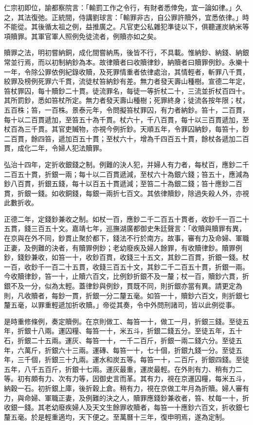 仁宗初即位，諭都察院言：「輸罰工作之令行，有財者悉倖免，宜一論如律。」久之，其法復弛。正統間，侍講劉球言：「輸罪非古，自公罪許贖外，宜悉依律。」時不能從。其後循太祖之例，益推廣之。凡官吏公私雜犯準徒以下，俱聽運炭納米等項贖罪。其軍官軍人照例免徒流者，例贖亦如之矣。

贖罪之法，明初嘗納銅，成化間嘗納馬，後皆不行，不具載。惟納鈔、納錢、納銀常並行焉，而以初制納鈔為本。故律贖者曰收贖律鈔，納贖者曰贖罪例鈔。永樂十一年，令除公罪依例紀錄收贖，及死罪情重者依律處治，其情輕者，斬罪八千貫，絞罪及榜例死罪六千貫，流徒杖笞納鈔有差。無力者發天壽山種樹。宣德二年定，笞杖罪囚，每十贖鈔二十貫。徒流罪名，每徒一等折杖二十，三流並折杖百四十。其所罰鈔，悉如笞杖所定。無力者發天壽山種樹；死罪終身；徒流各按年限；杖，五百株；笞，一百株。景泰元年，令問擬笞杖罪囚，有力者納鈔。笞十，二百貫，每十以二百貫遞加，至笞五十為千貫。杖六十，千八百貫，每十以三百貫遞加，至杖百為三千貫。其官吏贓物，亦視今例折鈔。天順五年，令罪囚納鈔，每笞十，鈔二百貫，餘四笞，遞加百五十貫；至杖六十，增為千四百五十貫，餘杖各遞加二百貫，成化二年，令婦人犯法贖罪。

弘治十四年，定折收銀錢之制。例難的決人犯，并婦人有力者，每杖百，應鈔二千二百五十貫，折銀一兩；每十以二百貫遞減，至杖六十為銀六錢；笞五十，應減為鈔八百貫，折銀五錢，每十以百五十貫遞減；至笞二十為銀二錢；笞十應鈔二百貫，折銀一錢。如收銅錢，每銀一兩折七百文。其依律贖鈔，除過失殺人外，亦視此數折收。

正德二年，定錢鈔兼收之制。如杖一百，應鈔二千二百五十貫者，收鈔千一百二十五貫，錢三百五十文。嘉靖七年，巡撫湖廣都御史朱廷聲言：「收贖與贖罪有異，在京與在外不同，鈔貫止聚於都下，錢法不行於南方。故事，審有力及命婦、軍職正妻，及例難的決者，有贖罪例鈔；老幼廢疾及婦人餘罪，有收贖律鈔。贖罪例鈔，錢鈔兼收，如笞一十，收鈔百貫，收錢三十五文，其鈔二百貫，折銀一錢。杖一百，收鈔千一百二十五貫，收錢三百五十文，其鈔二千二百五十貫，折銀一兩。今收贖律鈔，笞一十，止贖六百文，比例鈔折銀不及一釐；杖一百，贖鈔六貫，折銀不及一分，似為太輕。蓋律鈔與例鈔，貫既不同，則折銀亦當有異。請更定為則，凡收贖者，每鈔一貫，折銀一分二釐五毫。如笞一十，贖鈔六百文，則折銀七釐五毫，以罪重輕遞加折收贖。」帝從其奏，令中外問刑諸司，皆以此例從事。

是時重修條例，奏定贖例。在京則做工、每笞一十，做工一月，折銀三錢。至徒五年，折銀十八兩。運囚糧、每笞一十，米五斗，折銀二錢五分。至徒五年，五十石，折銀二十五兩。運灰、每笞一十，一千二百斤，折銀一兩二錢六分。至徒五年，六萬斤，折銀六十三兩。運磚、每笞一十，七十個，折銀九錢一分。至徒五年，三千個，折銀三十九兩。運水和炭五等。每笞一十，二百斤，折銀四錢。至徒五年，八千五百斤，折銀十七兩。運灰最重，運炭最輕。在外則有力、稍有力二等。初有頗有力、次有力等，因御史言而革。其有力，視在京運囚糧，每米五斗，納穀一石。初折銀上庫，後折穀上倉。稍有力，視在京做工年月為折贖。婦人審有力，與命婦、軍職正妻，及例難的決之人，贖罪應錢鈔兼收者，笞、杖每一十，折收銀一錢。其老幼廢疾婦人及天文生餘罪收贖者，每笞一十應鈔六百文，折收銀七釐五毫。於是輕重適均，天下便之。至萬曆十三年，復申明焉，遂為定制。

